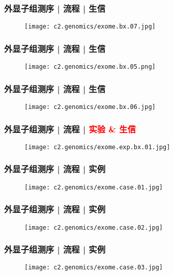 \begin{frame}
  \frametitle{外显子组测序 | 流程 | 生信}
  \begin{figure}
    \centering
    \texttt{[image: c2.genomics/exome.bx.07.jpg]}
  \end{figure}
\end{frame}

\begin{frame}
  \frametitle{外显子组测序 | 流程 | 生信}
  \begin{figure}
    \centering
    \texttt{[image: c2.genomics/exome.bx.05.png]}
  \end{figure}
\end{frame}

\begin{frame}
  \frametitle{外显子组测序 | 流程 | 生信}
  \begin{figure}
    \centering
    \texttt{[image: c2.genomics/exome.bx.06.jpg]}
  \end{figure}
\end{frame}

\begin{frame}
  \frametitle{外显子组测序 | 流程 | \textcolor{red}{实验 \& 生信}}
  \begin{figure}
    \centering
    \texttt{[image: c2.genomics/exome.exp.bx.01.jpg]}
  \end{figure}
\end{frame}

\begin{frame}
  \frametitle{外显子组测序 | 流程 | 实例}
  \begin{figure}
    \centering
    \texttt{[image: c2.genomics/exome.case.01.jpg]}
  \end{figure}
\end{frame}

\begin{frame}
  \frametitle{外显子组测序 | 流程 | 实例}
  \begin{figure}
    \centering
    \texttt{[image: c2.genomics/exome.case.02.jpg]}
  \end{figure}
\end{frame}

\begin{frame}
  \frametitle{外显子组测序 | 流程 | 实例}
  \begin{figure}
    \centering
    \texttt{[image: c2.genomics/exome.case.03.jpg]}
  \end{figure}
\end{frame}

